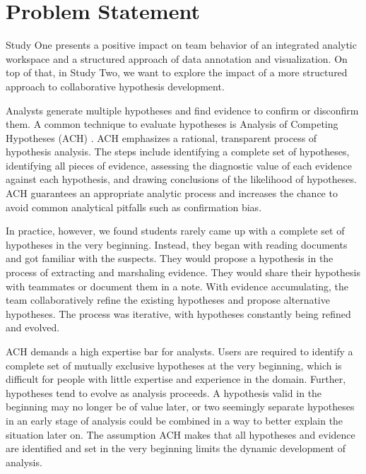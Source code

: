 \section{Problem Statement}

Study One presents a positive impact on team behavior of an integrated analytic workspace and a structured approach of data annotation and visualization. On top of that, in Study Two, we want to explore the impact of a more structured approach to collaborative hypothesis development. 

Analysts generate multiple hypotheses and find evidence to confirm or disconfirm them. A common technique to evaluate hypotheses is Analysis of Competing Hypotheses (ACH) \citep{Heuer1999}. ACH emphasizes a rational, transparent process of hypothesis analysis. The steps include identifying a complete set of hypotheses, identifying all pieces of evidence, assessing the diagnostic value of each evidence against each hypothesis, and drawing conclusions of the likelihood of hypotheses. ACH guarantees an appropriate analytic process and increases the chance to avoid common analytical pitfalls such as confirmation bias.

In practice, however, we found students rarely came up with a complete set of hypotheses in the very beginning. Instead, they began with reading documents and got familiar with the suspects. They would propose a hypothesis in the process of extracting and marshaling evidence. They would share their hypothesis with teammates or document them in a note. With evidence accumulating, the team collaboratively refine the existing hypotheses and propose alternative hypotheses. The process was iterative, with hypotheses constantly being refined and evolved.

ACH demands a high expertise bar for analysts. Users are required to identify a complete set of mutually exclusive hypotheses at the very beginning, which is difficult for people with little expertise and experience in the domain. Further, hypotheses tend to evolve as analysis proceeds. A hypothesis valid in the beginning may no longer be of value later, or two seemingly separate hypotheses in an early stage of analysis could be combined in a way to better explain the situation later on. The assumption ACH makes that all hypotheses and evidence are identified and set in the very beginning limits the dynamic development of analysis.


